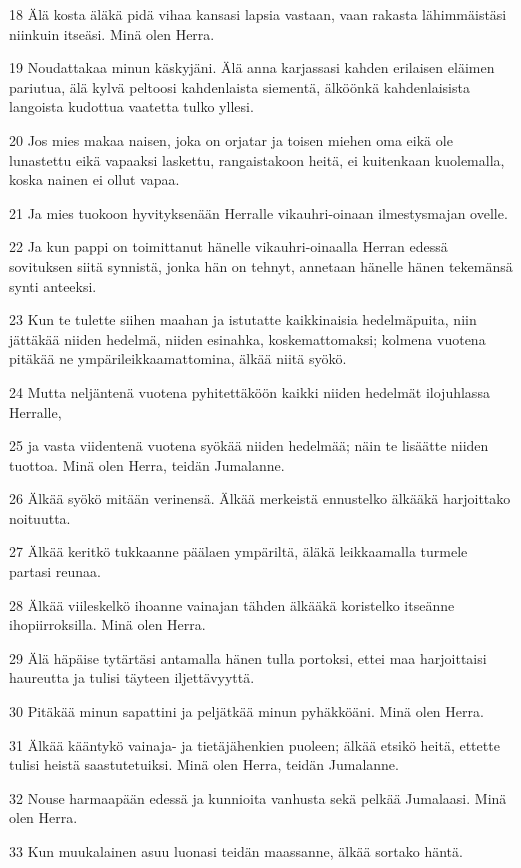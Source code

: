 \par 18 Älä kosta äläkä pidä vihaa kansasi lapsia vastaan, vaan rakasta lähimmäistäsi niinkuin itseäsi. Minä olen Herra.
\par 19 Noudattakaa minun käskyjäni. Älä anna karjassasi kahden erilaisen eläimen pariutua, älä kylvä peltoosi kahdenlaista siementä, älköönkä kahdenlaisista langoista kudottua vaatetta tulko yllesi.
\par 20 Jos mies makaa naisen, joka on orjatar ja toisen miehen oma eikä ole lunastettu eikä vapaaksi laskettu, rangaistakoon heitä, ei kuitenkaan kuolemalla, koska nainen ei ollut vapaa.
\par 21 Ja mies tuokoon hyvityksenään Herralle vikauhri-oinaan ilmestysmajan ovelle.
\par 22 Ja kun pappi on toimittanut hänelle vikauhri-oinaalla Herran edessä sovituksen siitä synnistä, jonka hän on tehnyt, annetaan hänelle hänen tekemänsä synti anteeksi.
\par 23 Kun te tulette siihen maahan ja istutatte kaikkinaisia hedelmäpuita, niin jättäkää niiden hedelmä, niiden esinahka, koskemattomaksi; kolmena vuotena pitäkää ne ympärileikkaamattomina, älkää niitä syökö.
\par 24 Mutta neljäntenä vuotena pyhitettäköön kaikki niiden hedelmät ilojuhlassa Herralle,
\par 25 ja vasta viidentenä vuotena syökää niiden hedelmää; näin te lisäätte niiden tuottoa. Minä olen Herra, teidän Jumalanne.
\par 26 Älkää syökö mitään verinensä. Älkää merkeistä ennustelko älkääkä harjoittako noituutta.
\par 27 Älkää keritkö tukkaanne päälaen ympäriltä, äläkä leikkaamalla turmele partasi reunaa.
\par 28 Älkää viileskelkö ihoanne vainajan tähden älkääkä koristelko itseänne ihopiirroksilla. Minä olen Herra.
\par 29 Älä häpäise tytärtäsi antamalla hänen tulla portoksi, ettei maa harjoittaisi haureutta ja tulisi täyteen iljettävyyttä.
\par 30 Pitäkää minun sapattini ja peljätkää minun pyhäkköäni. Minä olen Herra.
\par 31 Älkää kääntykö vainaja- ja tietäjähenkien puoleen; älkää etsikö heitä, ettette tulisi heistä saastutetuiksi. Minä olen Herra, teidän Jumalanne.
\par 32 Nouse harmaapään edessä ja kunnioita vanhusta sekä pelkää Jumalaasi. Minä olen Herra.
\par 33 Kun muukalainen asuu luonasi teidän maassanne, älkää sortako häntä.
